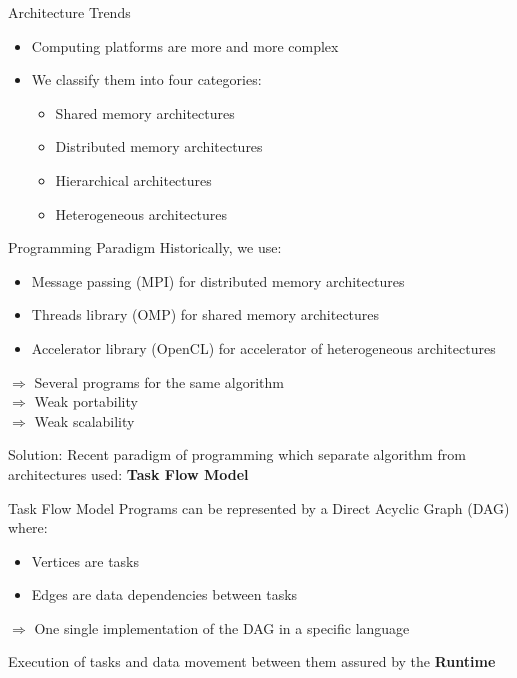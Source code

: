 \begin{frame}{Architecture Trends}
\begin{itemize}
\item Computing platforms are more and more complex
\item We classify them into four categories:
\begin{itemize}
\item Shared memory architectures
\item Distributed memory architectures
\item Hierarchical architectures
\item Heterogeneous architectures
\end{itemize}
\end{itemize}
\end{frame}

\begin{frame}{Programming Paradigm}
Historically, we use:
\begin{itemize}
\item Message passing (MPI) for distributed memory architectures
\item Threads library (OMP) for shared memory architectures
\item Accelerator library (OpenCL) for accelerator of heterogeneous architectures
\end{itemize}
\pause
$\Rightarrow$ Several programs for the same algorithm\\
$\Rightarrow$ Weak portability\\
$\Rightarrow$ Weak scalability\\
\pause
\begin{exampleblock}{Solution:}
Recent paradigm of programming which separate algorithm from architectures used: \textbf{Task Flow Model}
\end{exampleblock}
\end{frame}

\begin{frame}{Task Flow Model}
Programs can be represented by a Direct Acyclic Graph (DAG) where:
\begin{itemize}
\item Vertices are tasks
\item Edges are data dependencies between tasks
\end{itemize}
\pause
\begin{flushleft}
$\Rightarrow$ One single implementation of the DAG in a specific language
\end{flushleft}
\pause
\begin{flushleft}
Execution of tasks and data movement between them assured by the \textbf{Runtime}
\end{flushleft}
\end{frame}


